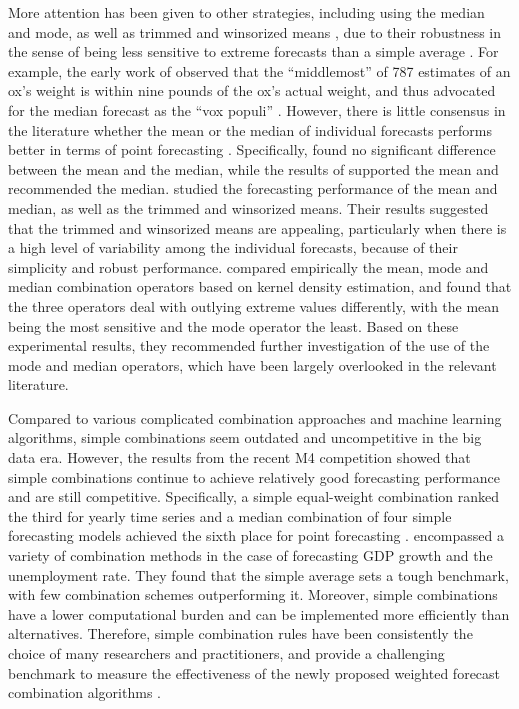 \documentclass[a4paper,11pt]{article}
\begin{document}
More attention has been given to other strategies, including using the median and mode, as well as trimmed and winsorized means \citep[e.g.,][]{Chan1999-io,Stock2004-rq,Genre2013-ut,Jose2014-uh,Grushka-Cockayne2017-dj}, due to their robustness in the sense of being less sensitive to extreme forecasts than a simple average \citep{Lichtendahl2020-ut}. For example, the early work of \citet{Galton1907-vox} observed that the ``middlemost'' of 787 estimates of an ox's weight is within nine pounds of the ox's actual weight, and thus advocated for the median forecast as the ``vox populi'' \citep{Galton1907-one}. However, there is little consensus in the literature whether the mean or the median of individual forecasts performs better in terms of point forecasting \citep{Kolassa2011-ai}. Specifically, \citet{McNees1992-qc} found no significant difference between the mean and the median, while the results of \citet{Stock2004-rq} supported the mean and \citet{Agnew1985-dj,Galton1907-vox} recommended the median. \citet{Jose2008-vm} studied the forecasting performance of the mean and median, as well as the trimmed and winsorized means. Their results suggested that the trimmed and winsorized means are appealing, particularly when there is a high level of variability among the individual forecasts, because of their simplicity and robust performance. \citet{Kourentzes2014-hs} compared empirically the mean, mode and median combination operators based on kernel density estimation, and found that the three operators deal with outlying extreme values differently, with the mean being the most sensitive and the mode operator the least. Based on these experimental results, they recommended further investigation of the use of the mode and median operators, which have been largely overlooked in the relevant literature.

Compared to various complicated combination approaches and machine learning algorithms, simple combinations seem outdated and uncompetitive in the big data era. However, the results from the recent M4 competition \citep{Makridakis2020-hu} showed that simple combinations continue to achieve relatively good forecasting performance and are still competitive. Specifically, a simple equal-weight combination ranked the third for yearly time series \citep{Shaub2019-on} and a median combination of four simple forecasting models achieved the sixth place for point forecasting \citep{Petropoulos2020-fp}. \citet{Genre2013-ut} encompassed a variety of combination methods in the case of forecasting GDP growth and the unemployment rate. They found that the simple average sets a tough benchmark, with few combination schemes outperforming it. Moreover, simple combinations have a lower computational burden and can be implemented more efficiently than alternatives. Therefore, simple combination rules have been consistently the choice of many researchers and practitioners, and provide a challenging benchmark to measure the effectiveness of the newly proposed weighted forecast combination algorithms \citep[e.g.,][]{Makridakis2000-he,Stock2004-rq,Makridakis2020-hu,Montero-Manso2020-tq,Kang2020-rl,Wang2021-un}.
\end{document}
